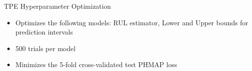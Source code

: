 \documentclass{beamer}
\begin{document}
        \begin{frame}{TPE Hyperparameter Optimization}

            \begin{itemize}
                \item Optimizes the following models: RUL estimator, Lower and Upper bounds for  prediction intervals
                \item 500 trials per model
                \item Minimizes the 5-fold cross-validated test PHMAP loss
            \end{itemize}

            \begin{table}[!htbp]
                \centering
                \caption{Proposed hyperparameter search space}
            \end{table}
        \end{frame}
\end{document}
